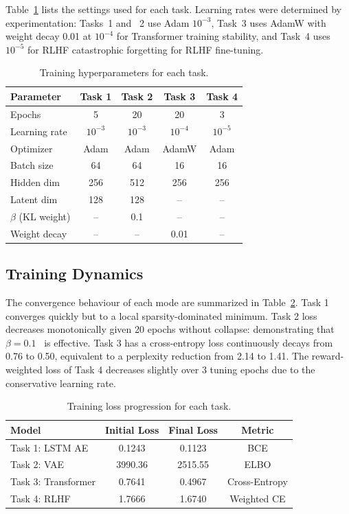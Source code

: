 \documentclass[conference]{IEEEtran}
\begin{document}
Table~\ref{tab:hyper} lists the settings used for each task. Learning rates were determined by experimentation:
Tasks~1 and ~2 use Adam $10^{-3}$, Task~3 uses AdamW with weight decay 0.01 at $10^{-4}$ for Transformer training stability, and Task~4 uses $10^{-5}$ for RLHF
catastrophic forgetting for RLHF fine-tuning.

\begin{table}[H]
\caption{Training hyperparameters for each task.}
\label{tab:hyper}
\centering\small
\begin{tabular}{lcccc}
\toprule
Parameter & Task 1 & Task 2 & Task 3 & Task 4 \\
\midrule
Epochs & 5 & 20 & 20 & 3 \\
Learning rate & $10^{-3}$ & $10^{-3}$ & $10^{-4}$ & $10^{-5}$ \\
Optimizer & Adam & Adam & AdamW & Adam \\
Batch size & 64 & 64 & 16 & 16 \\
Hidden dim & 256 & 512 & 256 & 256 \\
Latent dim & 128 & 128 & -- & -- \\
$\beta$ (KL weight) & -- & 0.1 & -- & -- \\
Weight decay & -- & -- & 0.01 & -- \\
\bottomrule
\end{tabular}
\end{table}

\subsection{Training Dynamics}

The convergence behaviour of each mode are summarized in Table~\ref{tab:train}. Task 1 converges quickly but to a local sparsity-dominated minimum. Task 2 loss decreases monotonically given 20 epochs without collapse: demonstrating that  $\beta = 0.1$ ~is effective. Task 3 has a cross-entropy loss continuously decays from 0.76 to 0.50, equivalent to a perplexity reduction from 2.14 to 1.41. The reward-weighted loss of Task 4 decreases slightly over 3 tuning epochs due to the conservative learning rate.

\begin{table}[H]
\caption{Training loss progression for each task.}
\label{tab:train}
\centering\small
\begin{tabular}{lccc}
\toprule
Model & Initial Loss & Final Loss & Metric \\
\midrule
Task 1: LSTM AE & 0.1243 & 0.1123 & BCE \\
Task 2: VAE & 3990.36 & 2515.55 & ELBO \\
Task 3: Transformer & 0.7641 & 0.4967 & Cross-Entropy \\
Task 4: RLHF & 1.7666 & 1.6740 & Weighted CE \\
\bottomrule
\end{tabular}
\end{table}
\end{document}

